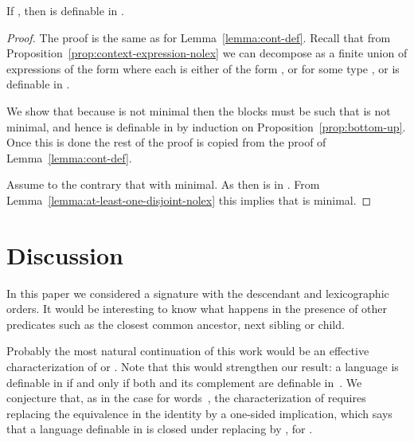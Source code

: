 \documentclass{LMCS}
\begin{document}
{\begin{lem}  \label{lemma:proper-stabilizer}
If , then  is definable in .
\end{lem}
\begin{proof}
  The proof is the same as for Lemma~\ref{lemma:cont-def}.
  Recall that from Proposition~\ref{prop:context-expression-nolex} we can decompose
   as a finite union of expressions of the form  where each  is either of the form , or  for some type , or is definable in .

  We show that because  is not minimal then the blocks  must be
  such that  is not minimal, and hence  is definable in \Stwo by
  induction on Proposition~\ref{prop:bottom-up}. Once this is done the rest of
  the proof is copied from the proof of Lemma~\ref{lemma:cont-def}.

  Assume to the contrary that  with  minimal. As  then  is in . From
  Lemma~\ref{lemma:at-least-one-disjoint-nolex} this implies that  is
  minimal.
\end{proof}
}

\section{Discussion}
\label{sec:conclusion}
In this paper we considered a signature with the descendant and
lexicographic orders. It would be interesting to know what happens in
the presence of other predicates such as the closest common ancestor,
next sibling or child.

Probably the most natural continuation of this work would be an
effective characterization of \Stwo or \Stwol. Note that this would
strengthen our result: a language  is definable in  if
and only if both  and its complement are definable
in~. We conjecture that, as in the case for
words~\cite{arfi91}, the characterization of \Stwol requires replacing
the equivalence in the  identity by a one-sided implication,
which says that a language definable in \Stwol is closed under
replacing  by , for .
\end{document}
